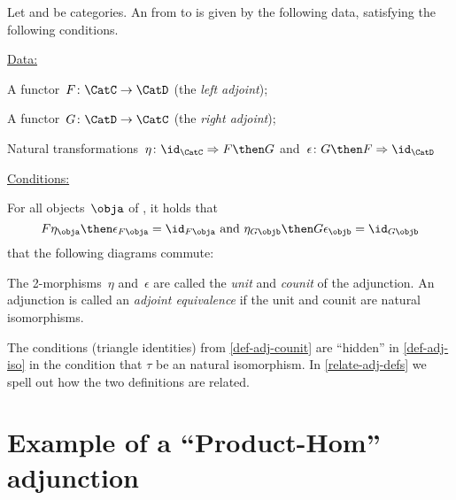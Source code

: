 \begin{ctdefinition}\label{def-adj-counit}
  \label{def:cat-adjunction}
 Let \CatC and \CatD be categories. An \emph{} from \CatC to \CatD is given by the following data, satisfying the following conditions.

  \underline{Data:}
  \begin{compactenum}
    \item A functor~$F\colon \CatC \to \CatD$ (the \emph{left adjoint});
    \item A functor~$G\colon \CatD \to \CatC$ (the \emph{right adjoint});
    \item Natural transformations~$\eta \colon \id_\CatC \Rightarrow F \then G$ and~$\epsilon \colon G \then F \Rightarrow \id_\CatD$
  \end{compactenum}

  \underline{Conditions:}
  \begin{compactenum}
    \item For all objects~$\obja$ of \CatC, it holds that
    \begin{equation*}
      F\eta_\obja \then \epsilon_{F\obja} = \id_{F\obja} \text{ and }  \eta_{G\objb} \then G\epsilon_\objb = \id_{G\objb}
    \end{equation*}
     that the following diagrams commute:

\begin{center}
\end{center}
  \end{compactenum}
  
  The 2-morphisms~$\eta$ and~$\epsilon$ are called the \emph{unit} and \emph{counit} of the adjunction.
  An adjunction is called an \emph{adjoint equivalence} if the unit and counit are natural isomorphisms.
\end{ctdefinition}

\begin{remark}
The conditions (triangle identities) from \cref{def-adj-counit} are ``hidden'' in \cref{def-adj-iso} in the condition that $\tau$ be an natural isomorphism. In \cref{relate-adj-defs} we spell out how the two definitions are related. 
\end{remark}

\section{Example of a ``Product-Hom'' adjunction}

